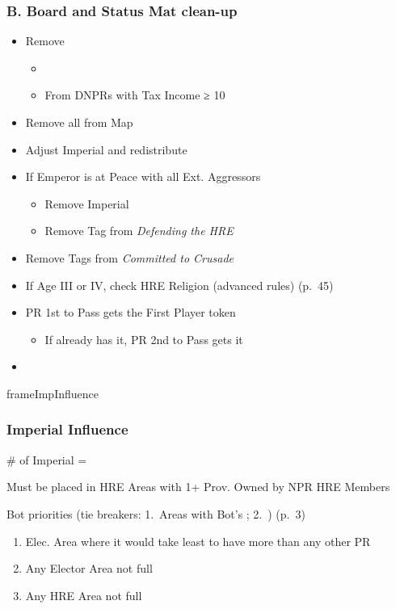 \documentclass[10pt]{article}
\newlength{\fhImpInfluence} \setlength\fhImpInfluence{10\baselineskip}
\begin{document}
\subsubsection*{B. Board and Status Mat clean-up}
\begin{itemize}
	\item Remove \alliances
	\begin{itemize}
		\item {}
		\item From DNPRs with Tax Income ≥ 10\ducats
	\end{itemize}
	\item Remove all \plague from Map
	\item {}Adjust Imperial \influence and redistribute
	\item If Emperor is at Peace with all Ext. Aggressors
	\begin{itemize}
		\item Remove Imperial \manpower
		\item Remove Tag from \emph{Defending the HRE}
	\end{itemize}
	\item Remove Tags from \emph{Committed to Crusade}
	\item {}If Age III or IV, check HRE Religion (advanced rules) (p.~45)
	\item PR 1st to Pass gets the First Player token
	\begin{itemize}
		\item If already has it, PR 2nd to Pass gets it
	\end{itemize}
	\item {}
\end{itemize}
\begin{dynamiccontents*}{frameImpInfluence}\begin{eubox}{\fhImpInfluence}
	\subsubsection*{Imperial Influence }
	\begin{itemize}
		\item \# of Imperial \influence = \authority
		\item Must be placed in HRE Areas with 1+ Prov. Owned by NPR HRE Members
		{\botrules
		\item Bot priorities (tie breakers: 1. Areas with Bot's \allies; 2. \az) (p.~3)
		\begin{enumerate}
			\item Elec. Area where it would take least \influence to have more \influence than any other PR
			\item Any Elector Area not full
			\item Any HRE Area not full
		\end{enumerate}
		}
	\end{itemize}
\end{eubox}\end{dynamiccontents*}
\end{document}
